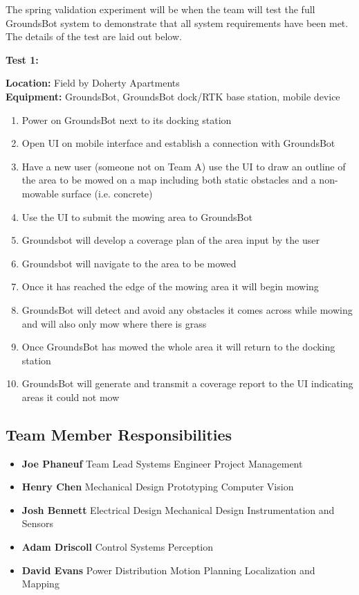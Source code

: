 \documentclass[12pt]{extarticle}
\begin{document}
	The spring validation experiment will be when the team will test the full GroundsBot system to demonstrate that all system requirements have been met. The details of the test are laid out below.
\begin{center}
 \textbf{Test 1: }
\end{center}
 \textbf{Location:} Field by Doherty Apartments \\
 \textbf{Equipment:} GroundsBot, GroundsBot dock/RTK base station, mobile device \\
\begin{enumerate}
  \item Power on GroundsBot next to its docking station
  \item Open UI on mobile interface and establish a connection with GroundsBot
  \item Have a new user (someone not on Team A) use the UI to draw an outline of the area to be mowed on a map including both static obstacles and a non-mowable surface (i.e. concrete)
  \item Use the UI to submit the mowing area to GroundsBot
  \item Groundsbot will develop a coverage plan of the area input by the user
  \item Groundsbot will navigate to the area to be mowed
  \item Once it has reached the edge of the mowing area it will begin mowing
  \item GroundsBot will detect and avoid any obstacles it comes across while mowing and will also only mow where there is grass
  \item Once GroundsBot has mowed the whole area it will return to the docking station
  \item GroundsBot will generate and transmit a coverage report to the UI indicating areas it could not mow
\end{enumerate}

\subsection{Team Member Responsibilities}
\begin{itemize}
  \item [] \textbf{Joe Phaneuf}
    \subitem  Team Lead
    \subitem  Systems Engineer
    \subitem  Project Management
  \item [] \textbf{Henry Chen}
    \subitem  Mechanical Design
    \subitem  Prototyping
    \subitem  Computer Vision
  \item [] \textbf{Josh Bennett}
    \subitem  Electrical Design
    \subitem  Mechanical Design
    \subitem  Instrumentation and Sensors
  \item [] \textbf{Adam Driscoll}
    \subitem  Control Systems
    \subitem  Perception
  \item [] \textbf{David Evans}
    \subitem  Power Distribution
    \subitem  Motion Planning
    \subitem  Localization and Mapping
\end{itemize}
\end{document}
